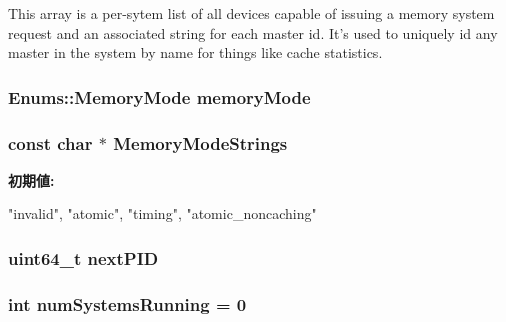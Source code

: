\label{classSystem_af29dc1c2c4242f28c6934043af159765}
This array is a per-\/sytem list of all devices capable of issuing a memory system request and an associated string for each master id. It's used to uniquely id any master in the system by name for things like cache statistics. \hypertarget{classSystem_a22abae1a5557f96f7fc5a0ef3c660141}{
\subsubsection[{memoryMode}]{\setlength{\rightskip}{0pt plus 5cm}Enums::MemoryMode {\bf memoryMode}}}
\label{classSystem_a22abae1a5557f96f7fc5a0ef3c660141}
\hypertarget{classSystem_a166de98735762528d9fd0d7cbd0ff5db}{
\subsubsection[{MemoryModeStrings}]{\setlength{\rightskip}{0pt plus 5cm}const char $\ast$ {\bf MemoryModeStrings}}}
\label{classSystem_a166de98735762528d9fd0d7cbd0ff5db}
{\bfseries 初期値:}
\begin{DoxyCode}
 {"invalid", "atomic", "timing",
                                            "atomic_noncaching"}
\end{DoxyCode}
\hypertarget{classSystem_a940df2387a1775c99f43e7e189a8c0fa}{
\subsubsection[{nextPID}]{\setlength{\rightskip}{0pt plus 5cm}uint64\_\-t {\bf nextPID}}}
\label{classSystem_a940df2387a1775c99f43e7e189a8c0fa}
\hypertarget{classSystem_a1adea9b3072c7e8d2d045b275c8e37e7}{
\subsubsection[{numSystemsRunning}]{\setlength{\rightskip}{0pt plus 5cm}int {\bf numSystemsRunning} = 0}}
